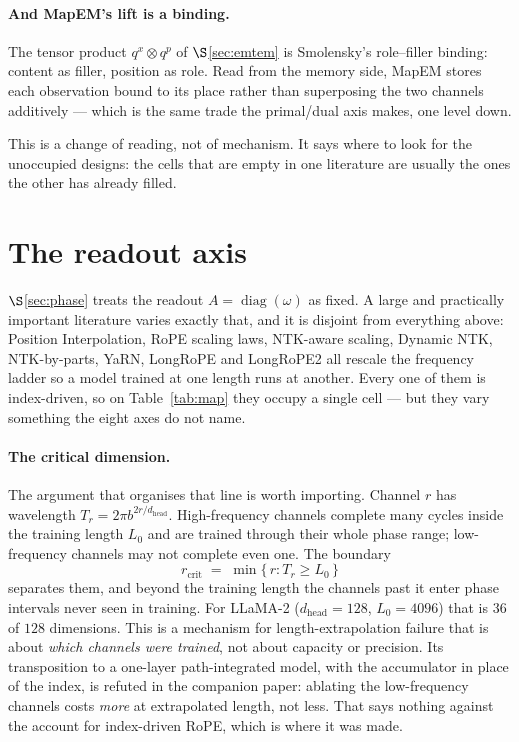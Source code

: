\documentclass[11pt]{article}
\newcommand{\hd}{d_{\mathrm{head}}}
\begin{document}
\paragraph{And MapEM's lift is a binding.} The tensor product
$q^x \otimes q^p$ of $\S$\ref{sec:emtem} is Smolensky's role--filler binding: content
as filler, position as role. Read from the memory side, MapEM stores each
observation bound to its place rather than superposing the two channels additively
--- which is the same trade the primal/dual axis makes, one level down.

\medskip
\noindent This is a change of reading, not of mechanism. It says where to look for the unoccupied designs: the cells that are
empty in one literature are usually the ones the other has already filled.


\section{The readout axis}
\label{sec:readout}

$\S$\ref{sec:phase} treats the readout $A = \operatorname{diag}(\omega)$ as fixed.
A large and practically important literature varies exactly that, and it is disjoint
from everything above: Position Interpolation, RoPE scaling laws, NTK-aware scaling,
Dynamic NTK, NTK-by-parts, YaRN, LongRoPE and LongRoPE2 all rescale the frequency
ladder so a model trained at one length runs at another. Every one of them is
index-driven, so on Table~\ref{tab:map} they occupy a single cell --- but they vary something the
eight axes do not name.

\paragraph{The critical dimension.} The argument that organises that line is worth
importing. Channel $r$ has wavelength $T_r = 2\pi b^{2r/\hd}$. High-frequency
channels complete many cycles inside the training length $L_0$ and are trained
through their whole phase range; low-frequency channels may not complete even one.
The boundary
\[
  r_{\mathrm{crit}} \;=\; \min\{\,r : T_r \ge L_0\,\}
\]
separates them, and beyond the training length the channels past it enter phase
intervals never seen in training. For LLaMA-2 ($\hd = 128$, $L_0 = 4096$) that is
$36$ of $128$ dimensions. This is a mechanism for length-extrapolation failure that
is about \emph{which channels were trained}, not about capacity or precision. Its
transposition to a one-layer path-integrated model, with the accumulator in place of
the index, is refuted in the companion paper: ablating the low-frequency channels
costs \emph{more} at extrapolated length, not less. That says nothing against the
account for index-driven RoPE, which is where it was made.
\end{document}
